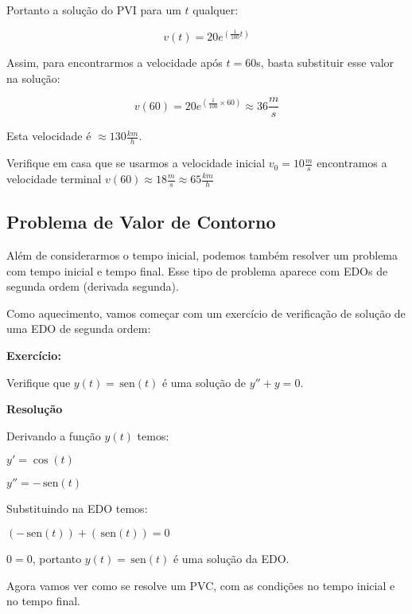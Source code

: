 \documentclass[a4paper]{article}
\providecommand{\sin}{} \renewcommand{\sin}{\hspace{2pt}\mathrm{sen}}
\begin{document}
Portanto a solução do PVI para um $t$ qualquer:

\begin{displaymath}
  v(t) = 20e^{(\frac{1}{100}t)}
\end{displaymath}

Assim, para encontrarmos a velocidade após $t=60$s, basta substituir
esse valor na solução:

\begin{displaymath}
  v(60) = 20e^{(\frac{1}{100}\times 60)} \approx 36\frac{m}{s}
\end{displaymath}

Esta velocidade é $\approx 130\frac{km}{h}$.

Verifique em casa que se usarmos a velocidade inicial
$v_0=10\frac{m}{s}$ encontramos a velocidade terminal
$v(60) \approx 18\frac{m}{s} \approx 65\frac{km}{h}$

\subsection{Problema de Valor de Contorno}

Além de considerarmos o tempo inicial, podemos também resolver um
problema com tempo inicial e tempo final. Esse tipo de problema
aparece com EDOs de segunda ordem (derivada segunda).

Como aquecimento, vamos começar com um exercício de verificação de
solução de uma EDO de segunda ordem:

{\bf Exercício:}

Verifique que $y(t) = \sin (t)$ é uma solução de $y''+y=0$.

\bigskip

{\bf Resolução}


Derivando a função $y(t)$ temos:

$y' = \cos(t)$

$y'' = -\sin(t)$

Substituindo na EDO temos:

$\left(-\sin(t)\right) + \left(\sin(t)\right) =0$

$0=0$, portanto $y(t) = \sin(t)$ é uma solução da EDO.


Agora vamos ver como se resolve um PVC, com as condições no tempo
inicial e no tempo final.
\end{document}
